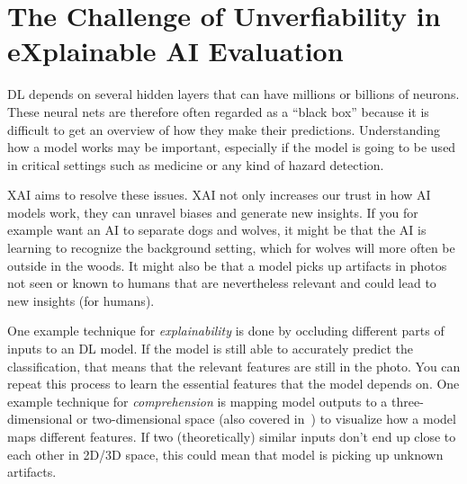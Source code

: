 \documentclass[10pt,twocolumn,letterpaper]{article}
\begin{document}
\section{The Challenge of Unverfiability in eXplainable AI Evaluation}\label{sec:xai}

\gls{DL} depends on several hidden layers that can have millions or billions of neurons. These neural nets are therefore often regarded as a ``black box'' because it is difficult to get an overview of how they make their predictions. Understanding how a model works may be important, especially if the model is going to be used in critical settings such as medicine or any kind of hazard detection. 

\gls{XAI} aims to resolve these issues. \gls{XAI} not only increases our trust in how \gls{AI} models work, they can unravel biases and generate new insights. If you for example want an \gls{AI} to separate dogs and wolves, it might be that the \gls{AI} is learning to recognize the background setting, which for wolves will more often be outside in the woods. It might also be that a model picks up artifacts in photos not seen or known to humans that are nevertheless relevant and could lead to new insights (for humans).

One example technique for \textit{explainability} is done by occluding different parts of inputs to an \gls{DL} model. If the model is still able to accurately predict the classification, that means that the relevant features are still in the photo. You can repeat this process to learn the essential features that the model depends on. One example technique for \textit{comprehension} is mapping model outputs to a three-dimensional or two-dimensional space (also covered in~) to visualize how a model maps different features. If two (theoretically) similar inputs don't end up close to each other in 2D/3D space, this could mean that model is picking up unknown artifacts.
\end{document}
